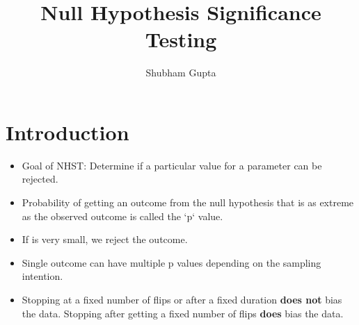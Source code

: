 \documentclass[a4paper]{article}
\title{Null Hypothesis Significance Testing}
\author{Shubham Gupta}
\begin{document}
\maketitle

\section{Introduction}
\begin{itemize}
    \item Goal of NHST: Determine if a particular value for a parameter can be rejected.
    \item Probability of getting an outcome from the null hypothesis that is as extreme as the observed outcome is called the `p` value.
    \item If  is very small, we reject the outcome.
    \item Single outcome can have multiple p values depending on the sampling intention.
    \item Stopping at a fixed number of flips or after a fixed duration \textbf{does not} bias the data. Stopping after getting a fixed number of flips \textbf{does} bias the data.
\end{itemize}
\end{document}
